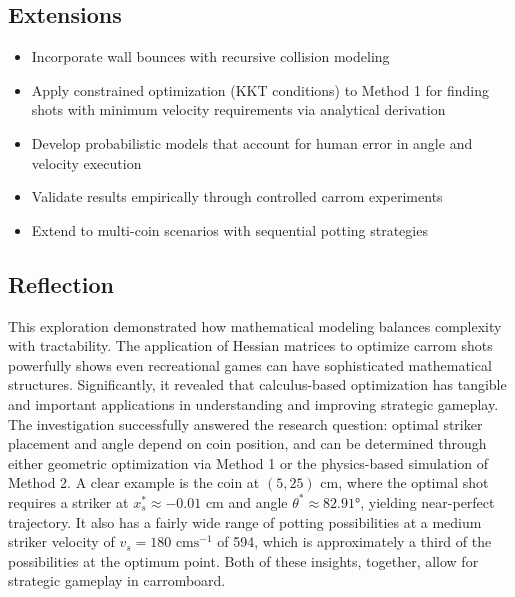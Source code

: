\documentclass[10pt]{article}
\begin{document}
\subsection{Extensions}
\begin{itemize}
    \item Incorporate wall bounces with recursive collision modeling
    \item Apply constrained optimization (KKT conditions) to Method 1 for finding shots with minimum velocity requirements via analytical derivation
    \item Develop probabilistic models that account for human error in angle and velocity execution
    \item Validate results empirically through controlled carrom experiments
    \item Extend to multi-coin scenarios with sequential potting strategies
\end{itemize}

\subsection{Reflection}
This exploration demonstrated how mathematical modeling balances complexity with tractability. The application of Hessian matrices to optimize carrom shots powerfully shows even recreational games can have sophisticated mathematical structures. Significantly, it revealed that calculus-based optimization has tangible and important applications in understanding and improving strategic gameplay.
The investigation successfully answered the research question: optimal striker placement and angle depend on coin position, and can be determined through either geometric optimization via Method 1 or the physics-based simulation of Method 2.
A clear example is the coin at $(5, 25)$ cm, where the optimal shot requires a striker at $x_s^* \approx -0.01$ cm and angle $\theta^* \approx 82.91°$, yielding near-perfect trajectory. It also has a fairly wide range of potting possibilities at a medium striker velocity of $v_s = 180 \text{ cms}^{-1}$ of 594, which is approximately a third of the possibilities at the optimum point. Both of these insights, together, allow for strategic gameplay in carromboard.
\nocite{*}
\printbibliography[heading=subbibliography]
\end{document}
